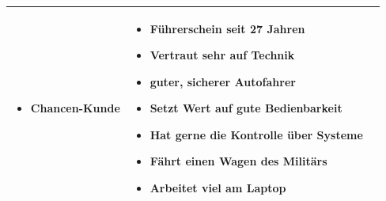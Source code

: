 \begin{center}
\begin{tabular}{| p{} | p{} | p{} |}
\begin{itemize}
			\item Chancen-Kunde
		\end{itemize}	
		& 
		\begin{itemize}
			\item Führerschein seit 27 Jahren
			\item Vertraut sehr auf Technik
			\item guter, sicherer Autofahrer
			\item Setzt Wert auf gute Bedienbarkeit
			\item Hat gerne die Kontrolle über Systeme
			\item Fährt einen Wagen des Militärs
			\item Arbeitet viel am Laptop
		\end{itemize}
		\\[0.5cm]
		\hline
	\end{tabular}
\end{center}
